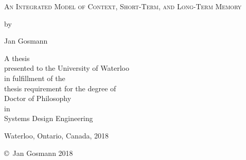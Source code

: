 \frontmatter

\begin{titlepage}
        \begin{center}
        \vspace*{1.0cm}

        \Huge
        {\textsc{An Integrated Model of Context, Short-Term, and Long-Term Memory}}

        \vspace*{1.0cm}

        \normalsize
        by \\

        \vspace*{1.0cm}

        \Large
        Jan Gosmann \\

        \vspace*{3.0cm}

        \normalsize
        A thesis \\
        presented to the University of Waterloo \\ 
        in fulfillment of the \\
        thesis requirement for the degree of \\
        Doctor of Philosophy \\
        in \\
        Systems Design Engineering \\

        \vspace*{2.0cm}

        Waterloo, Ontario, Canada, 2018 \\

        \vspace*{1.0cm}

        \copyright\ Jan Gosmann 2018 \\
        \end{center}
\end{titlepage}

\pagestyle{plain}

\cleardoublepage %
 
